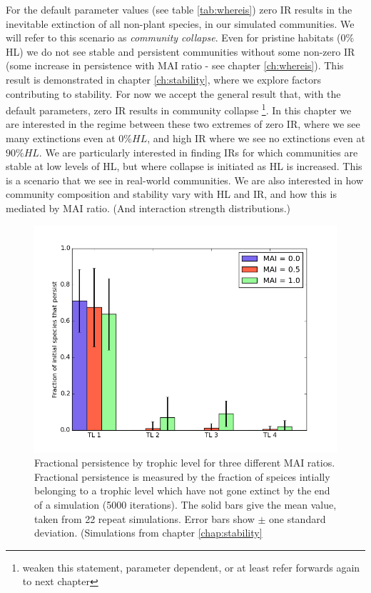\begin{itemize}
For the default parameter values (see table \ref{tab:whereis}) zero IR results in the inevitable extinction of all non-plant species, in our simulated communities. We will refer to this scenario as \emph{community collapse}. Even for pristine habitats ($0\%$ HL) we do not see stable and persistent communities without some non-zero IR (some increase in persistence with MAI ratio - see chapter \ref{ch:whereis}). This result is demonstrated in chapter \ref{ch:stability}, where we explore factors contributing to stability. For now we accept the general result that, with the default parameters, zero IR results in community collapse \footnote{weaken this statement, parameter dependent, or at least refer forwards again to next chapter}. In this chapter we are interested in the regime between these two extremes of zero IR, where we see many extinctions even at $0\% HL$, and high IR where we see no extinctions even at $90\% HL$. We are particularly interested in finding IRs for which communities are stable at low levels of HL, but where collapse is initiated as HL is increased. This is a scenario that we see in real-world communities. We are also interested in how community composition and stability vary with HL and IR, and how this is mediated by MAI ratio. (And interaction strength distributions.)

\begin{figure}
	\centering
	\includegraphics[width=0.8\linewidth]{"figures/hist_species_per_tl_zeroIR"}
	\caption{Fractional persistence by trophic level for three different MAI ratios. Fractional persistence is measured by the fraction of speices intially belonging to a trophic level which have not gone extinct by the end of a simulation (5000 iterations). The solid bars give the mean value, taken  from 22 repeat simulations. Error bars show $\pm$ one standard deviation. (Simulations from chapter \ref{chap:stability}}
	\label{fig:mvp_hist_zeroIR}
\end{figure}



\end{itemize}
